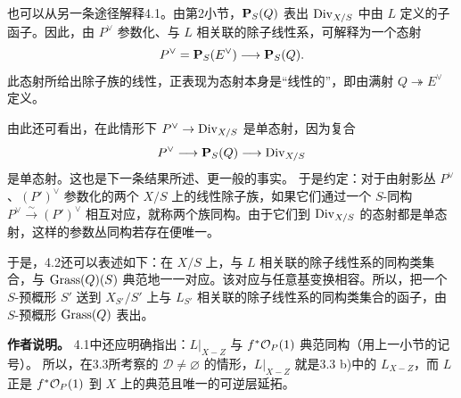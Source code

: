 也可以从另一条途径解释4.1。由第2小节，\(\mathbf P_S(Q)\) 表出 \(\operatorname{Div}_{X/S}\) 中由 \(L\) 定义的子函子。因此，由 \(P^\vee\) 参数化、与 \(L\) 相关联的除子线性系，可解释为一个态射
\[
 P^\vee=\mathbf P_S(E^\vee)\longrightarrow\mathbf P_S(Q).
\]
此态射所给出除子族的线性，正表现为态射本身是“线性的”，即由满射 \(Q\twoheadrightarrow E^\vee\) 定义。

由此还可看出，在此情形下 \(P^\vee\to\operatorname{Div}_{X/S}\) 是单态射，因为复合
\[
 P^\vee\longrightarrow\mathbf P_S(Q)\longrightarrow\operatorname{Div}_{X/S}
\]
是单态射。这也是下一条结果所述、更一般的事实。
于是约定：对于由射影丛 \(P^\vee\)、\((P')^\vee\) 参数化的两个 \(X/S\) 上的线性除子族，如果它们通过一个 \(S\)-同构 \(P^\vee\xrightarrow{\sim}(P')^\vee\) 相互对应，就称两个族同构。由于它们到 \(\operatorname{Div}_{X/S}\) 的态射都是单态射，这样的参数丛同构若存在便唯一。

于是，4.2还可以表述如下：在 \(X/S\) 上，与 \(L\) 相关联的除子线性系的同构类集合，与 \(\operatorname{Grass}(Q)(S)\) 典范地一一对应。该对应与任意基变换相容。所以，把一个 \(S\)-预概形 \(S'\) 送到 \(X_{S'}/S'\) 上与 \(L_{S'}\) 相关联的除子线性系的同构类集合的函子，由 \(S\)-预概形 \(\operatorname{Grass}(Q)\) 表出。

\medskip
\noindent\textbf{作者说明。}
4.1中还应明确指出：\(L|_{X-Z}\) 与 \(f^*\mathcal O_P(1)\) 典范同构（用上一小节的记号）。
所以，在3.3所考察的 \(\mathcal D\ne\varnothing\) 的情形，\(L|_{X-Z}\) 就是3.3 b)中的 \(L_{X-Z}\)，而 \(L\) 正是 \(f^*\mathcal O_P(1)\) 到 \(X\) 上的典范且唯一的可逆层延拓。
\par\endgroup
